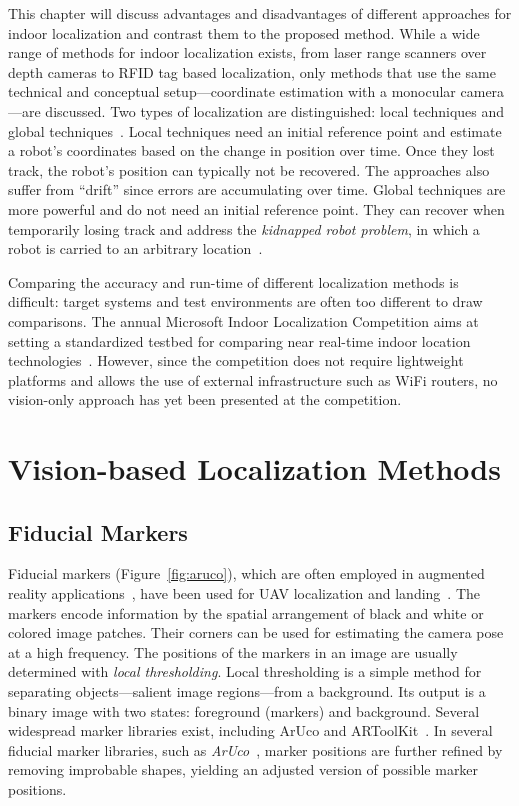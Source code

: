 \documentclass{report}
\begin{document}
This chapter will discuss advantages and disadvantages of different
approaches for indoor localization and contrast them to the proposed
method. While a wide range of methods for indoor localization exists,
from laser range scanners over depth cameras to RFID tag based
localization, only methods that use the same technical and conceptual
setup---coordinate estimation with a monocular camera---are
discussed. Two types of localization are distinguished: local
techniques and global techniques~\cite{fox1999monte}. Local techniques
need an initial reference point and estimate a robot's coordinates
based on the change in position over time. Once they lost track, the
robot's position can typically not be recovered. The approaches also
suffer from ``drift'' since errors are accumulating over time. Global
techniques are more powerful and do not need an initial reference
point. They can recover when temporarily losing track and address the
\emph{kidnapped robot problem}, in which a robot is carried to an
arbitrary location~\cite{engelson1992error}.

Comparing the accuracy and run-time of different localization methods
is difficult: target systems and test environments are often too
different to draw comparisons. The annual Microsoft Indoor
Localization Competition aims at setting a standardized testbed for
comparing near real-time indoor location
technologies~\cite{microsoft}. However, since the competition does not
require lightweight platforms and allows the use of external
infrastructure such as WiFi routers, no vision-only approach has yet
been presented at the competition.

\section{Vision-based Localization Methods}

\subsection{Fiducial Markers}
\label{sec:fiducialmarkers}

Fiducial markers (Figure~\ref{fig:aruco}), which are often employed in
augmented reality
applications~\cite{kato1999marker,garrido2014automatic}, have been
used for UAV localization and
landing~\cite{eberli2011vision,bebop2015}. The markers encode
information by the spatial arrangement of black and white or colored
image patches. Their corners can be used for estimating the camera
pose at a high frequency. The positions of the markers in an image are
usually determined with \emph{local thresholding}. Local thresholding
is a simple method for separating objects---salient image
regions---from a background. Its output is a binary image with two
states: foreground (markers) and background. Several widespread marker
libraries exist, including ArUco and
ARToolKit~\cite{kato1999marker}. In several fiducial marker libraries,
such as \emph{ArUco}~\cite{aruco2014}, marker positions are further
refined by removing improbable shapes, yielding an adjusted version of
possible marker positions.
\end{document}
